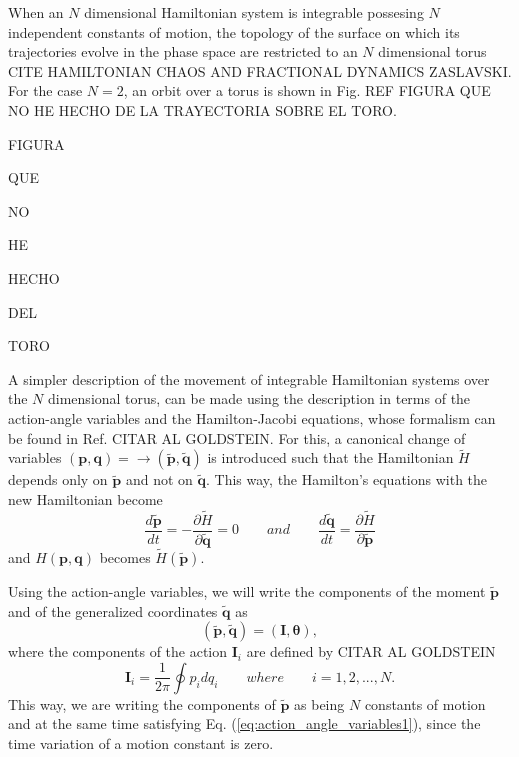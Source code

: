 When an $N$ dimensional Hamiltonian system is integrable possesing $N$ independent constants of motion, the topology of the surface on which its trajectories evolve in the phase space are restricted to an $N$ dimensional torus CITE HAMILTONIAN CHAOS AND FRACTIONAL DYNAMICS ZASLAVSKI. For the case $N=2$, an orbit over a torus is shown in Fig. REF FIGURA QUE NO HE HECHO DE LA TRAYECTORIA SOBRE EL TORO.

FIGURA\par 
QUE\par
NO\par
HE\par 
HECHO\par
DEL\par
TORO\par

A simpler description of the movement of integrable Hamiltonian systems over the $N$ dimensional torus, can be made using the description in terms of the action-angle variables and the Hamilton-Jacobi equations, whose formalism can be found in Ref. CITAR AL GOLDSTEIN. For this, a canonical change of variables $(\bm{p},\bm{q})=\rightarrow (\tilde{\bm{p}},\tilde{\bm{q}})$ is introduced such that the Hamiltonian $\tilde{H}$ depends only on $\tilde{\bm{p}}$ and not on $\tilde{\bm{q}}$. This way, the Hamilton's equations with the new Hamiltonian become
\begin{equation}
\frac{d\tilde{\bm{p}}}{dt}= -\frac{\partial \tilde{H}}{\partial \tilde{\bm{q}}}=0  \qquad and \qquad  
\frac{d\tilde{\bm{q}}}{dt}= \frac{\partial \tilde{H}}{\partial \tilde{\bm{p}}}
\label{eq:action_angle_variables1}
\end{equation}
and $H(\bm{p},\bm{q})$ becomes $\tilde{H}(\tilde{\bm{p}})$.\par


Using the action-angle variables, we will write the components of the moment $\tilde{\bm{p}}$ and of the generalized coordinates $\tilde{\bm{q}}$ as
\begin{equation}
(\tilde{\bm{p}},\tilde{\bm{q}})=(\bm{I},\bm{\theta}),
\end{equation}
where the components of the action $\bm{I}_i$ are defined by CITAR AL GOLDSTEIN
\begin{equation}
\bm{I}_i=\frac{1}{2\pi}\oint p_idq_i \qquad where \qquad i=1,2,...,N.
\end{equation}
This way, we are writing the components of $\tilde{\bm{p}}$ as being $N$ constants of motion and at the same time satisfying Eq. (\ref{eq:action_angle_variables1}), since the time variation of a motion constant is zero.\par

